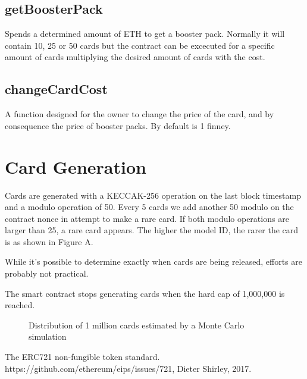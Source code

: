 \documentclass[11pt,twocolumn]{article}
\begin{document}
\subsection{getBoosterPack}
Spends a determined amount of ETH to get a booster pack. Normally it will contain 10, 25 or 50 cards but the contract can be excecuted for a specific amount of cards multiplying the desired amount of cards with the cost.
\subsection{changeCardCost}
A function designed for the owner to change the price of the card, and by consequence the price of booster packs. By default is 1 finney.
\section{Card Generation}
Cards are generated with a KECCAK-256 operation on the last block timestamp and a modulo operation of 50. Every 5 cards we add another 50 modulo on the contract nonce in attempt to make a rare card. If both modulo operations are larger than 25, a rare card appears. The higher the model ID, the rarer the card is as shown in Figure A.

While it's possible to determine exactly when cards are being released, efforts are probably not practical. 

The smart contract stops generating cards when the hard cap of 1,000,000 is reached.
\begin{figure}[!htb]
\centering 
    
\caption{Distribution of 1 million cards estimated by a Monte Carlo simulation} \label{fig:B}
\end{figure}


\onecolumn

\begin{thebibliography}{1}

         The ERC721 non-fungible token standard. https://github.com/ethereum/eips/issues/721, Dieter Shirley, 2017.
      
        \end{thebibliography}
\end{document}

